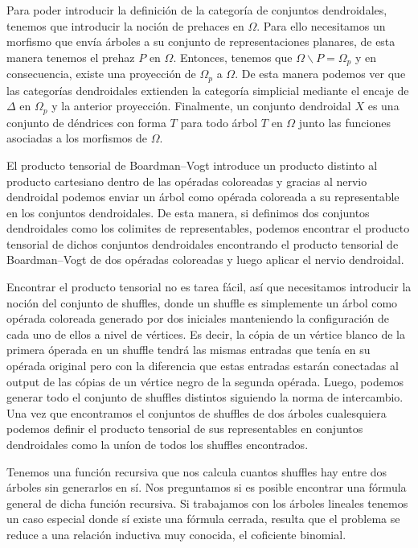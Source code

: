 \documentclass[11pt,a4paper,openright,oneside]{article}
\numberwithin{equation}{section}
\theoremstyle{definition}
\begin{document}
Para poder introducir la definici\'on de la categor\'ia de conjuntos dendroidales, tenemos que introducir la noci\'on de prehaces en $\Omega$. Para ello necesitamos un morfismo que env\'ia \'arboles a su conjunto de representaciones planares, de esta manera tenemos el prehaz $P$ en $\Omega$. Entonces, tenemos que $\Omega\backslash P = \Omega_p$ y en consecuencia, existe una proyecci\'on de $\Omega_p$ a $\Omega$.
De esta manera podemos ver que las categor\'ias dendroidales extienden la categor\'ia simplicial mediante el encaje de $\Delta$ en $\Omega_p$ y la anterior proyecci\'on. 
Finalmente, un conjunto dendroidal $X$ es una conjunto de d\'endrices con forma $T$ para todo \'arbol $T$ en $\Omega$ junto las funciones asociadas a los morfismos de $\Omega$.

El producto tensorial de Boardman--Vogt introduce un producto distinto al producto cartesiano dentro de las op\'eradas coloreadas y gracias al nervio dendroidal podemos enviar un \'arbol como op\'erada coloreada a su representable en los conjuntos dendroidales.
De esta manera, si definimos dos conjuntos dendroidales como los colimites de representables, podemos encontrar el producto tensorial de dichos conjuntos dendroidales encontrando el producto tensorial de Boardman--Vogt de dos op\'eradas coloreadas y luego aplicar el nervio dendroidal.

Encontrar el producto tensorial no es tarea f\'acil, as\'i que necesitamos introducir la noci\'on del conjunto de shuffles, donde un shuffle es simplemente un \'arbol como op\'erada coloreada generado por dos iniciales manteniendo la configuraci\'on de cada uno de ellos a nivel de v\'ertices. Es decir, la c\'opia de un v\'ertice blanco de la primera \'operada en un shuffle tendr\'a las mismas entradas que ten\'ia en su op\'erada original pero con la diferencia que estas entradas estar\'an conectadas al output de las c\'opias de un v\'ertice negro de la segunda op\'erada.
Luego, podemos generar todo el conjunto de shuffles distintos siguiendo la norma de intercambio. Una vez que encontramos el conjuntos de shuffles de dos \'arboles cualesquiera podemos definir el producto tensorial de sus representables en conjuntos dendroidales como la un\'ion de todos los shuffles encontrados.

Tenemos una funci\'on recursiva que nos calcula cuantos shuffles hay entre dos \'arboles sin generarlos en s\'i. Nos preguntamos si es posible encontrar una f\'ormula general de dicha funci\'on recursiva. Si trabajamos con los \'arboles lineales tenemos un caso especial donde s\'i existe una f\'ormula cerrada, resulta que el problema se reduce a una relaci\'on inductiva muy conocida, el coficiente binomial.
\end{document}
